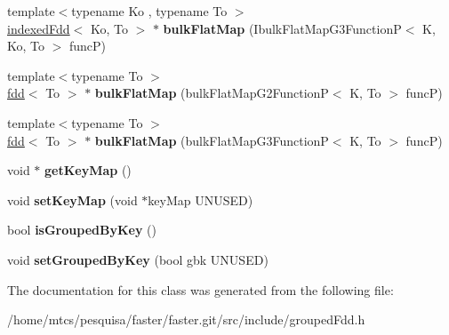 \begin{DoxyCompactItemize}
\item 
\hypertarget{classfaster_1_1groupedFdd_a3278e79b7930b60a9b7270442f5dd7fa}{}{\footnotesize template$<$typename Ko , typename To $>$ }\\\hyperlink{classfaster_1_1indexedFdd}{indexed\+Fdd}$<$ Ko, To $>$ $\ast$ {\bfseries bulk\+Flat\+Map} (Ibulk\+Flat\+Map\+G3\+Function\+P$<$ K, Ko, To $>$ func\+P)\label{classfaster_1_1groupedFdd_a3278e79b7930b60a9b7270442f5dd7fa}

\item 
\hypertarget{classfaster_1_1groupedFdd_a928ef7d6b2bbe1d07cfbb6fed1f9e858}{}{\footnotesize template$<$typename To $>$ }\\\hyperlink{classfaster_1_1fdd}{fdd}$<$ To $>$ $\ast$ {\bfseries bulk\+Flat\+Map} (bulk\+Flat\+Map\+G2\+Function\+P$<$ K, To $>$ func\+P)\label{classfaster_1_1groupedFdd_a928ef7d6b2bbe1d07cfbb6fed1f9e858}

\item 
\hypertarget{classfaster_1_1groupedFdd_afd1b583d3f24c565011797491849dd4e}{}{\footnotesize template$<$typename To $>$ }\\\hyperlink{classfaster_1_1fdd}{fdd}$<$ To $>$ $\ast$ {\bfseries bulk\+Flat\+Map} (bulk\+Flat\+Map\+G3\+Function\+P$<$ K, To $>$ func\+P)\label{classfaster_1_1groupedFdd_afd1b583d3f24c565011797491849dd4e}

\item 
\hypertarget{classfaster_1_1groupedFdd_ad422ed0f8b3f823924f035913a401ff8}{}void $\ast$ {\bfseries get\+Key\+Map} ()\label{classfaster_1_1groupedFdd_ad422ed0f8b3f823924f035913a401ff8}

\item 
\hypertarget{classfaster_1_1groupedFdd_ab7322fbd93c27dea8fcd3213289841fc}{}void {\bfseries set\+Key\+Map} (void $\ast$key\+Map U\+N\+U\+S\+E\+D)\label{classfaster_1_1groupedFdd_ab7322fbd93c27dea8fcd3213289841fc}

\item 
\hypertarget{classfaster_1_1groupedFdd_ad1ed9e32f977574a9e0a12396e6578aa}{}bool {\bfseries is\+Grouped\+By\+Key} ()\label{classfaster_1_1groupedFdd_ad1ed9e32f977574a9e0a12396e6578aa}

\item 
\hypertarget{classfaster_1_1groupedFdd_a9228818350b8ff2fdbeba48f06d57e00}{}void {\bfseries set\+Grouped\+By\+Key} (bool gbk U\+N\+U\+S\+E\+D)\label{classfaster_1_1groupedFdd_a9228818350b8ff2fdbeba48f06d57e00}

\end{DoxyCompactItemize}


The documentation for this class was generated from the following file\+:\begin{DoxyCompactItemize}
\item 
/home/mtcs/pesquisa/faster/faster.\+git/src/include/grouped\+Fdd.\+h\end{DoxyCompactItemize}
